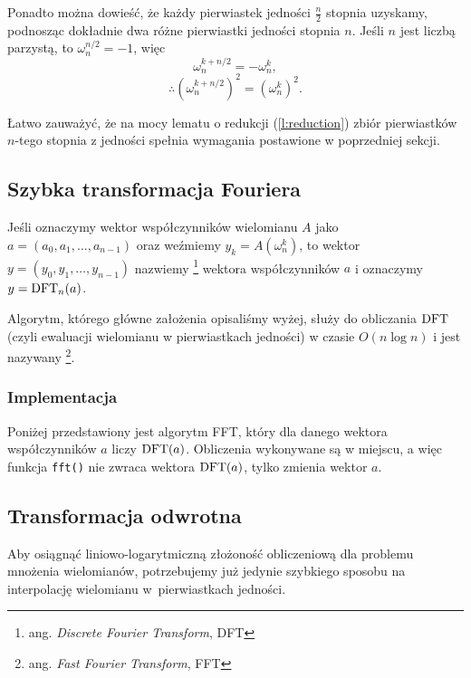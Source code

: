 \documentclass[11pt]{scrartcl}
\begin{document}
    Ponadto można dowieść, że każdy pierwiastek jedności $\frac{n}{2}$ stopnia uzyskamy, podnosząc dokładnie dwa różne pierwiastki jedności stopnia $n$. Jeśli $n$ jest liczbą parzystą, to $\omega_n^{n/2} = -1$, więc
    $$ \omega_n^{k+n/2} = -\omega_n^k, $$
    $$ \therefore (\omega_n^{k+n/2})^2 = (\omega_n^k)^2. $$

    Łatwo zauważyć, że na mocy lematu o redukcji (\ref{l:reduction}) zbiór pierwiastków $n$-tego stopnia z jedności spełnia wymagania postawione w poprzedniej sekcji.

    \subsection{Szybka transformacja Fouriera}
    Jeśli oznaczymy wektor współczynników wielomianu $A$ jako $a = (a_0, a_1, \ldots, a_{n-1})$ oraz weźmiemy $y_k = A(\omega_n^k)$, to wektor $y = (y_0, y_1, \ldots, y_{n-1})$ nazwiemy \footnote{ang. \textit{Discrete Fourier Transform}, DFT} wektora współczynników $a$ i oznaczymy $y = \operatorname{DFT}_n(a)$.

    Algorytm, którego główne założenia opisaliśmy wyżej, służy do obliczania $\operatorname{DFT}$ (czyli ewaluacji wielomianu w pierwiastkach jedności) w czasie $O(n\log n)$ i jest nazywany \footnote{ang. \textit{Fast Fourier Transform}, FFT}.

    \subsubsection{Implementacja}
    Poniżej przedstawiony jest algorytm FFT, który dla danego wektora współczynników $a$ liczy $\operatorname{DFT}(a)$. Obliczenia wykonywane są w miejscu, a więc funkcja \lstinline{fft()} nie zwraca wektora $\operatorname{DFT}(a)$, tylko zmienia wektor $a$.
    

    \subsection{Transformacja odwrotna}
    Aby osiągnąć liniowo-logarytmiczną złożoność obliczeniową dla problemu mnożenia wielomianów, potrzebujemy już jedynie szybkiego sposobu na interpolację wielomianu w~pierwiastkach jedności.
\end{document}
